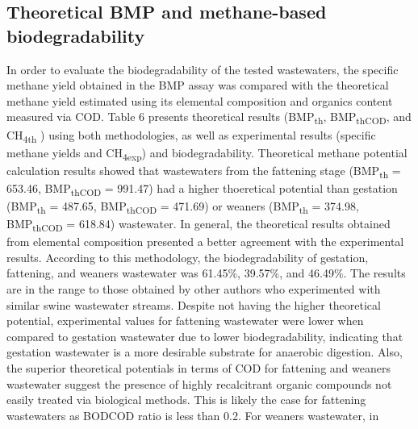 \subsection{Theoretical BMP and methane-based biodegradability}
In order to evaluate the biodegradability of the tested wastewaters, the specific methane yield obtained in the BMP assay was compared with the theoretical methane yield estimated using its elemental composition and organics content measured via COD. Table 6 presents theoretical results (BMP\textsubscript{th}, BMP\textsubscript{thCOD}, and CH\textsubscript{4th} ) using both methodologies, as well as experimental results (specific methane yields and CH\textsubscript{4exp}) and  biodegradability.  Theoretical methane potential calculation results showed that wastewaters from the fattening stage (BMP\textsubscript{th} = 653.46, BMP\textsubscript{thCOD} = 991.47) had a higher thoeretical potential than gestation (BMP\textsubscript{th} = 487.65, BMP\textsubscript{thCOD} = 471.69) or weaners (BMP\textsubscript{th} = 374.98, BMP\textsubscript{thCOD} = 618.84) wastewater. In general, the theoretical results obtained from elemental composition presented a better agreement with the experimental results. According to this methodology, the biodegradability of gestation, fattening, and weaners wastewater was 61.45\%, 39.57\%, and 46.49\%. The results are in the range to those obtained by other authors \cite{Zhang_2014} who experimented with similar swine wastewater streams. Despite not having the higher theoretical potential, experimental values for fattening wastewater were lower when compared to gestation wastewater due to lower biodegradability, indicating that gestation wastewater is a more desirable substrate for anaerobic digestion. Also, the superior theoretical potentials in terms of COD for fattening and weaners wastewater suggest the presence of highly recalcitrant organic compounds not easily treated via biological methods. This is likely the case for fattening wastewaters as BOD\/COD ratio is less than 0.2. For weaners wastewater, in 